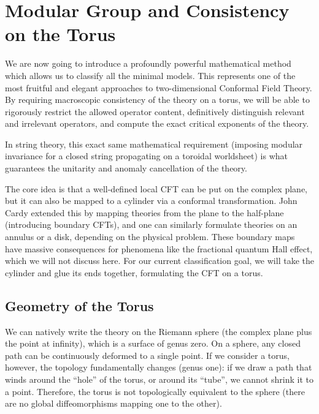 \section{Modular Group and Consistency on the Torus}

We are now going to introduce a profoundly powerful mathematical method which allows us to classify all the minimal models. This represents one of the most fruitful and elegant approaches to two-dimensional Conformal Field Theory. By requiring macroscopic consistency of the theory on a torus, we will be able to rigorously restrict the allowed operator content, definitively distinguish relevant and irrelevant operators, and compute the exact critical exponents of the theory.

\begin{remark}
    In string theory, this exact same mathematical requirement (imposing modular invariance for a closed string propagating on a toroidal worldsheet) is what guarantees the unitarity and anomaly cancellation of the theory.
\end{remark}

The core idea is that a well-defined local CFT can be put on the complex plane, but it can also be mapped to a cylinder via a conformal transformation. John Cardy extended this by mapping theories from the plane to the half-plane (introducing boundary CFTs), and one can similarly formulate theories on an annulus or a disk, depending on the physical problem. These boundary maps have massive consequences for phenomena like the fractional quantum Hall effect, which we will not discuss here. For our current classification goal, we will take the cylinder and glue its ends together, formulating the CFT on a torus.

\subsection{Geometry of the Torus}

We can natively write the theory on the Riemann sphere (the complex plane plus the point at infinity), which is a surface of genus zero. On a sphere, any closed path can be continuously deformed to a single point. If we consider a torus, however, the topology fundamentally changes (genus one): if we draw a path that winds around the ``hole'' of the torus, or around its ``tube'', we cannot shrink it to a point. Therefore, the torus is not topologically equivalent to the sphere (there are no global diffeomorphisms mapping one to the other).

